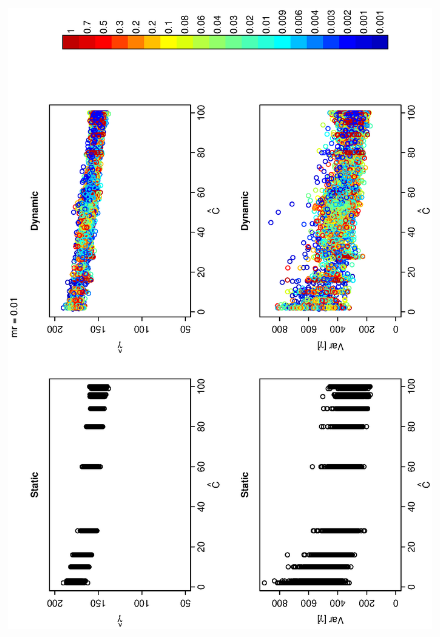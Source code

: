 \documentclass[12pt]{article}
\begin{document}
\begin{figure}[hb!]
\hspace{-0.5 in}\includegraphics[width=5in,angle=-90]{./figures/components_vs_gamma_5_4.eps}
\caption{}
\label{fig:Figure5}
\end{figure}
\end{document}
